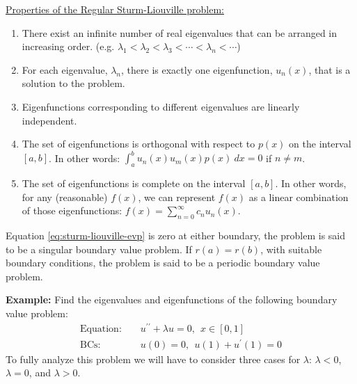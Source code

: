 \vspace{5.0cm}

\noindent\underline{Properties of the Regular Sturm-Liouville problem:}
\begin{enumerate}
\item There exist an infinite number of real eigenvalues that can be arranged in increasing order. (e.g. $\lambda_1 < \lambda_2 < \lambda_3 < \cdots < \lambda_n < \cdots$)
\item For each eigenvalue, $\lambda_n$, there is exactly one eigenfunction, $u_n(x)$, that is a solution to the problem.

\item Eigenfunctions corresponding to different eigenvalues are linearly independent.

\item The set of eigenfunctions is orthogonal with respect to $p(x)$ on the interval $[a,b]$.  In other words: $\int_{a}^{b}u_n(x) u_m(x) p(x) \ dx = 0$ if $n \ne m$.

\item The set of eigenfunctions is complete on the interval $[a,b]$.  In other words, for any (reasonable) $f(x)$, we can represent $f(x)$ as a linear combination of those eigenfunctions: $f(x) = \sum_{n=0}^{\infty} c_n u_n(x)$.
\end{enumerate}


 Equation \ref{eq:sturm-liouville-evp} is zero at either boundary, the problem is said to be a singular boundary value problem.  If $r(a) = r(b)$, with suitable boundary conditions, the problem is said to be a periodic boundary value problem.

\vspace{1.0cm}

\noindent\textbf{Example:} Find the eigenvalues and eigenfunctions of the following boundary value problem:
\begin{align*}
\text{Equation: }& & u^{\prime \prime}+\lambda u = 0,  \ \ x\in[0,1] \\
\text{BCs: }& & u(0) = 0, \ \ u(1) + u^{\prime}(1) = 0
\end{align*}
To fully analyze this problem we will have to consider three cases for $\lambda$: $\lambda < 0$, $\lambda = 0$, and $\lambda > 0$.

